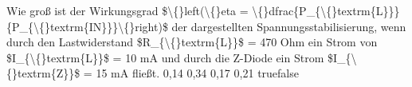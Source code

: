     {Wie groß ist der Wirkungsgrad \$\textbackslash\{\}left(\textbackslash\{\}eta = \textbackslash\{\}dfrac\{P\_\{\textbackslash\{\}textrm\{L\}\}\}\{P\_\{\textbackslash\{\}textrm\{IN\}\}\}\textbackslash\{\}right)\$ der dargestellten Spannungsstabilisierung, wenn durch den Lastwiderstand \$R\_\{\textbackslash\{\}textrm\{L\}\}\$ = 470 Ohm ein Strom von \$I\_\{\textbackslash\{\}textrm\{L\}\}\$ = 10 mA und durch die Z-Diode ein Strom \$I\_\{\textbackslash\{\}textrm\{Z\}\}\$ = 15 mA fließt.}
    {0,14}
    {0,34}
    {0,17}
    {0,21}
    {true}{false}
